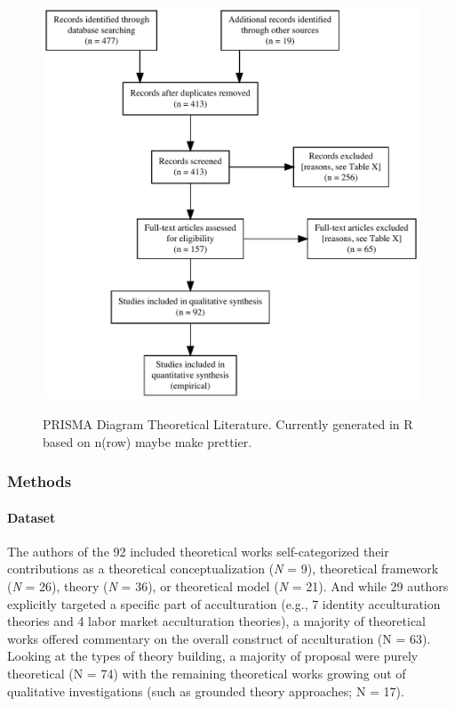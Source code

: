 \begin{figure}[h]
\centering
\caption{PRISMA Diagram Theoretical Literature. Currently generated in R based on n(row) maybe make prettier.}
\includegraphics[width=\textwidth]{Figures/PRISMA_Theories}
\label{fig:PRISMA_Theories}
\end{figure}



\subsubsection{Methods}
\paragraph{Dataset}

The authors of the 92 included theoretical works self-categorized their
contributions as a theoretical conceptualization (\textit{N} = 9),
theoretical framework (\textit{N} = 26), theory (\textit{N} = 36), or
theoretical model (\textit{N} = 21). And while 29 authors explicitly
targeted a specific part of acculturation (e.g., 7 identity
acculturation theories and 4 labor market acculturation theories), a
majority of theoretical works offered commentary on the overall
construct of acculturation (N = 63). Looking at the types of theory
building, a majority of proposal were purely theoretical (N = 74) with
the remaining theoretical works growing out of qualitative
investigations (such as grounded theory approaches; N = 17).

